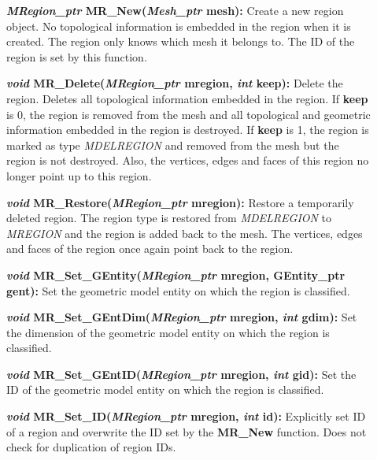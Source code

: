 \documentclass[12pt]{article}
\begin{document}
\begin{description}
\item[]\textbf{\textit{MRegion\_ptr} MR\_New(\textit{Mesh\_ptr}
    mesh):} Create a new region object. No topological information is
  embedded in the region when it is created. The region only knows
  which mesh it belongs to. The ID of the region is set by this
  function.

\item[]\textbf{\textit{void} MR\_Delete(\textit{MRegion\_ptr} mregion,
    \textit{int} keep):} Delete the region. Deletes all topological
  information embedded in the region. If \textbf{keep} is 0, the
  region is removed from the mesh and all topological and geometric
  information embedded in the region is destroyed. If \textbf{keep} is
  1, the region is marked as type \textit{MDELREGION} and removed from
  the mesh but the region is not destroyed. Also, the vertices, edges
  and faces of this region no longer point up to this region.
    
\item[]\textbf{\textit{void} MR\_Restore(\textit{MRegion\_ptr}
    mregion):} Restore a temporarily deleted region. The region type
  is restored from \textit{MDELREGION} to \textit{MREGION} and the
  region is added back to the mesh. The vertices, edges and faces of
  the region once again point back to the region.

\item[]
  
\item[]\textbf{\textit{void} MR\_Set\_GEntity(\textit{MRegion\_ptr}
    mregion, GEntity\_ptr gent):} Set the geometric model entity on
  which the region is classified.
  
\item[]\textbf{\textit{void} MR\_Set\_GEntDim(\textit{MRegion\_ptr}
    mregion, \textit{int} gdim):} Set the dimension of the geometric
  model entity on which the region is classified.
  
\item[]\textbf{\textit{void} MR\_Set\_GEntID(\textit{MRegion\_ptr}
    mregion, \textit{int} gid):} Set the ID of the geometric model
  entity on which the region is classified.
  
\item[]\textbf{\textit{void} MR\_Set\_ID(\textit{MRegion\_ptr}
    mregion, \textit{int} id):} Explicitly set ID of a region and
  overwrite the ID set by the \textbf{MR\_New} function. Does not
  check for duplication of region IDs.
  

\end{description}
\end{document}
